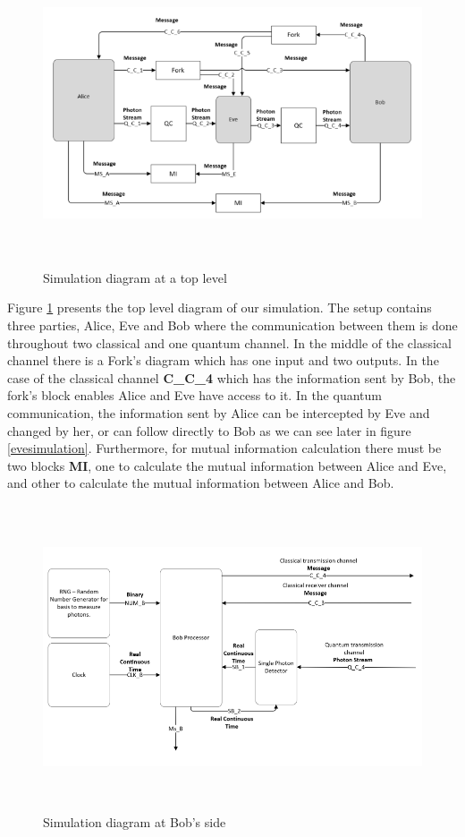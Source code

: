 \begin{figure}[H]
	\centering
	\includegraphics[width=1.0\textwidth, height=9cm]{./sdf/bb84_with_discrete_variables/figures/toplevel_simulation.png}
	\caption{Simulation diagram at a top level}\label{toplevelsimulation}
\end{figure}

Figure \ref{toplevelsimulation} presents the top level diagram of our simulation. The setup contains three parties, Alice, Eve and Bob where the communication between them is done throughout two classical and one quantum channel. In the middle of the classical channel there is a Fork's diagram which has one input and two outputs. In the case of the classical channel \textbf{C\_C\_4} which has the information sent by Bob, the fork's block enables Alice and Eve have access to it. In the quantum communication, the information sent by Alice can be intercepted by Eve and changed by her, or can follow directly to Bob as we can see later in figure \ref{evesimulation}. Furthermore, for mutual information calculation there must be two blocks \textbf{MI}, one to calculate the mutual information between Alice and Eve, and other to calculate the mutual information between Alice and Bob.

\begin{figure}[H]
	\centering
	\includegraphics[width=1.0\textwidth, height=9cm]{./sdf/bb84_with_discrete_variables/figures/bob_simulation.png}
	\caption{Simulation diagram at Bob's side}\label{bobsimulation}
\end{figure}

